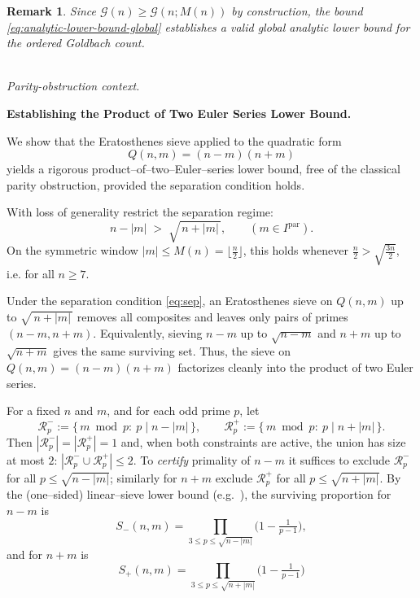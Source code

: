 \documentclass[11pt]{article}
\makeatletter
\theoremstyle{inline}
\newtheorem*{remark}{Remark}
\theoremstyle{break}
\renewenvironment{proof}[1][\proofname]{%
  \par\pushQED{\qed}%
  \normalfont \topsep6\p@\@plus6\p@\relax
  \trivlist
  \item[\hskip\labelsep
        \itshape
    #1\@addpunct{.}]\mbox{}\\  %
}{%
  \popQED\endtrivlist\@endpefalse
}
\theoremstyle{break}
\theoremstyle{break}
\theoremstyle{break}
\theoremstyle{break}
\theoremstyle{break}
\theoremstyle{break}
\theoremstyle{inline}
\makeatother
\begin{document}
\begin{remark}
Since \(\mathcal{G}(n) \ge \mathcal{G}(n;M(n))\) by construction, the bound
\eqref{eq:analytic-lower-bound-global} establishes a valid global
analytic lower bound for the ordered Goldbach count.
\end{remark}

\begin{proof}
\emph{Parity-obstruction context.}

\noindent\textbf{Establishing the Product of Two Euler Series Lower Bound.}

We show that the Eratosthenes sieve\cite{FriedlanderIwaniec2010} applied to the quadratic form
\begin{equation}
Q(n,m)=(n-m)(n+m)
\end{equation}
yields a rigorous product--of--two--Euler--series lower bound, free of the
classical parity obstruction\cite{Chen1973, IwaniecKowalski2004}, provided the separation condition holds.

With loss of generality restrict the separation regime:
\begin{equation}\label{eq:sep}
n-|m|\;>\;\sqrt{\,n+|m|\,}, \qquad (m\in I^{\mathrm{par}}).
\end{equation}
On the symmetric window \(|m|\le M(n)=\lfloor \frac{n}{2} \rfloor\), this holds whenever
\(\frac{n}{2} > \sqrt{\frac{3n}{2}}\), i.e. for all \(n\ge7\).  

Under the separation condition \eqref{eq:sep}, an Eratosthenes sieve on \(Q(n,m)\) up to
\(\sqrt{\,n+|m|\,}\) removes all composites and leaves only pairs of primes
\((n-m,n+m)\). Equivalently, sieving \(n-m\) up to \(\sqrt{n-m}\) and \(n+m\)
up to \(\sqrt{n+m}\) gives the same surviving set.  Thus, the sieve on \(Q(n,m)=(n-m)(n+m)\)
factorizes cleanly into the product of two Euler series.\cite{Vaughan1997}

For a fixed \(n\) and \(m\), and for each odd prime \(p\), let
\begin{equation}
\mathcal R_p^-:=\{\,m\bmod p:\ p\mid n-|m|\,\},\qquad
\mathcal R_p^+:=\{\,m\bmod p:\ p\mid n+|m|\,\}.
\end{equation}
Then \(|\mathcal R_p^-|=|\mathcal R_p^+|=1\) and, when both constraints are active,
the union has size at most \(2\):
\(|\mathcal R_p^-\cup\mathcal R_p^+|\le 2\).
To \emph{certify} primality of \(n\!-\!m\) it suffices to exclude
\(\mathcal R_p^-\) for all \(p\le\sqrt{n-|m|}\); similarly for \(n\!+\!m\)
exclude \(\mathcal R_p^+\) for all \(p\le\sqrt{n+|m|}\).
By the (one–sided) linear–sieve lower bound (e.g.\ \cite[Ch.~6]{IwaniecKowalski2004}),
the surviving proportion for \(n\!-\!m\) is
\begin{equation}
S_-(n,m) = \prod_{3\le p\le \sqrt{n-|m|}}\!\bigl(1-\tfrac{1}{p-1}\bigr),
\end{equation}
and for \(n\!+\!m\) is
\begin{equation}
S_+(n,m) = \prod_{3\le p\le \sqrt{n+|m|}}\!\bigl(1-\tfrac{1}{p-1}\bigr)
\end{equation}


\end{proof}
\end{document}

